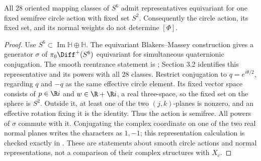 \begin{proposition}\label{push:src:C.3.3}
All 28 oriented mapping classes of $S^6$ admit representatives
equivariant for one fixed semifree circle action with fixed set $S^2$.
Consequently the circle action, its fixed set, and its normal weights
do not determine $[\Phi]$.
\end{proposition}


\begin{proof}
Use $S^6\subset\operatorname{Im}\mathbb H\oplus\mathbb H$.
The equivariant Blakers--Massey construction gives a generator
$\sigma$ of $\pi_0\Diff^+(S^6)$ equivariant for simultaneous
quaternionic conjugation. The smooth reentrance statement is
\citet[Theorem 2.1]{DuranRigas2007}; Section 3.2 identifies this
representative and its powers with all 28 classes. Restrict
conjugation to $q=e^{i\theta/2}$, regarding $q$ and $-q$ as the
same effective circle element. Its fixed vector space consists of
$p\in\R i$ and $w\in\R+\R i$, a real three-space, so the
fixed set on the sphere is $S^2$. Outside it, at least one of the
two $(j,k)$-planes is nonzero, and an effective rotation fixing it
is the identity. Thus the action is semifree. All powers of
$\sigma$ commute with it. Conjugating the complex coordinate on
one of the two real normal planes writes the characters as
$1,-1$; this representation calculation is checked exactly in
. These are statements about smooth circle
actions and normal representations, not a comparison of their
complex structures with $X_c$.
\end{proof}


